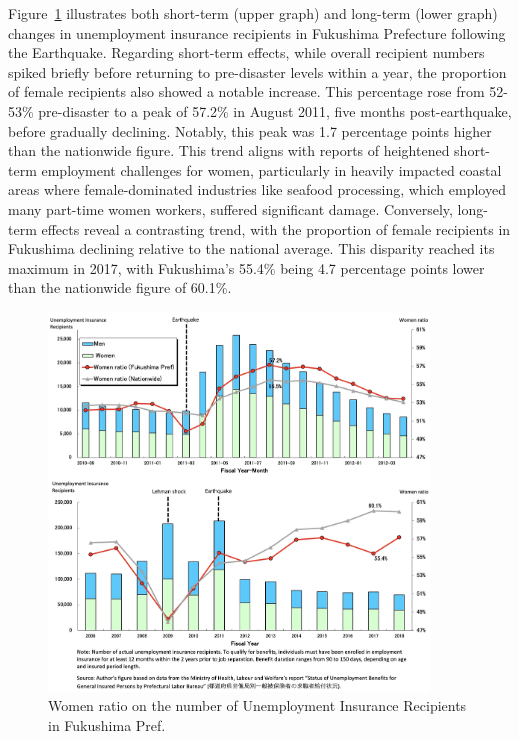 \documentclass[12pt,halfline,a4paper]{ouparticle}
\begin{document}
Figure~\ref{fig:women_ratio_fukushima2} illustrates both short-term (upper graph) and long-term (lower graph) changes in unemployment insurance recipients in Fukushima Prefecture following the Earthquake. Regarding short-term effects, while overall recipient numbers spiked briefly before returning to pre-disaster levels within a year, the proportion of female recipients also showed a notable increase. This percentage rose from 52-53\% pre-disaster to a peak of 57.2\% in August 2011, five months post-earthquake, before gradually declining. Notably, this peak was 1.7 percentage points higher than the nationwide figure. This trend aligns with reports of heightened short-term employment challenges for women, particularly in heavily impacted coastal areas where female-dominated industries like seafood processing, which employed many part-time women workers, suffered significant damage. Conversely, long-term effects reveal a contrasting trend, with the proportion of female recipients in Fukushima declining relative to the national average. This disparity reached its maximum in 2017, with Fukushima's 55.4\% being 4.7 percentage points lower than the nationwide figure of 60.1\%.


\begin{figure}[h!]
    \centering
    \includegraphics[width=0.9\textwidth]{Number of Actual Unemployment Insurance Recipients2.jpeg}  %
    \caption{Women ratio on the number of Unemployment Insurance Recipients in Fukushima Pref.}
    \label{fig:women_ratio_fukushima2}
\end{figure}
\end{document}
